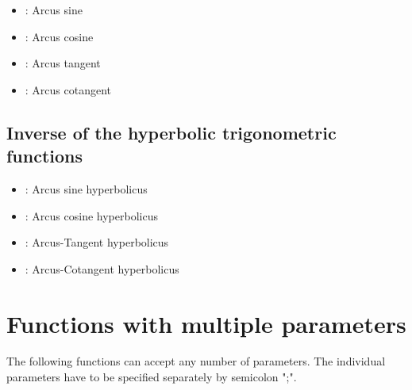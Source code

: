 \begin{itemize}

\item
{}:
Arcus sine

\item
{}:
Arcus cosine

\item
{}:
Arcus tangent

\item
{}:
Arcus cotangent

\end{itemize}



\section{Inverse of the hyperbolic trigonometric functions}

\begin{itemize}

\item
{}:
Arcus sine hyperbolicus

\item
{}:
Arcus cosine hyperbolicus

\item
{}:
Arcus-Tangent hyperbolicus

\item
{}:
Arcus-Cotangent hyperbolicus

\end{itemize}



\chapter{Functions with multiple parameters}

The following functions can accept any number of parameters.
The individual parameters have to be specified separately by semicolon ";".

